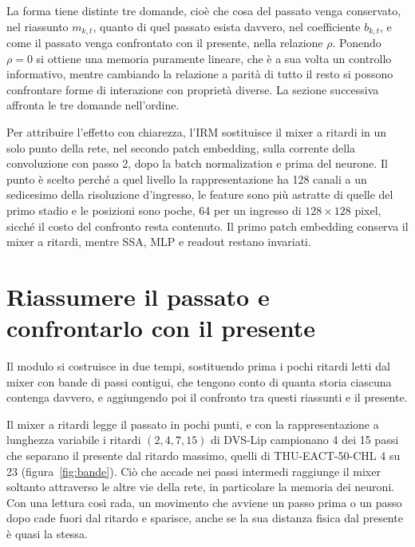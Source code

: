 La forma tiene distinte tre domande, cioè che cosa del passato venga conservato, nel riassunto $m_{k,t}$, quanto di quel passato esista davvero, nel coefficiente $b_{k,t}$, e come il passato venga confrontato con il presente, nella relazione $\rho$. Ponendo $\rho=0$ si ottiene una memoria puramente lineare, che è a sua volta un controllo informativo, mentre cambiando la relazione a parità di tutto il resto si possono confrontare forme di interazione con proprietà diverse. La sezione successiva affronta le tre domande nell'ordine.

Per attribuire l'effetto con chiarezza, l'IRM sostituisce il mixer a ritardi in un solo punto della rete, nel secondo patch embedding, sulla corrente della convoluzione con passo 2, dopo la batch normalization e prima del neurone. Il punto è scelto perché a quel livello la rappresentazione ha 128 canali a un sedicesimo della risoluzione d'ingresso, le feature sono più astratte di quelle del primo stadio e le posizioni sono poche, 64 per un ingresso di $128\times128$ pixel, sicché il costo del confronto resta contenuto. Il primo patch embedding conserva il mixer a ritardi, mentre SSA, MLP e readout restano invariati.



\section{Riassumere il passato e confrontarlo con il presente}
\label{sec:memoria_intervalli}
\label{sec:relazione}

Il modulo si costruisce in due tempi, sostituendo prima i pochi ritardi letti dal mixer con bande di passi contigui, che tengono conto di quanta storia ciascuna contenga davvero, e aggiungendo poi il confronto tra questi riassunti e il presente.

\label{subsec:ritardi_bande}
Il mixer a ritardi legge il passato in pochi punti, e con la rappresentazione a lunghezza variabile i ritardi $(2,4,7,15)$ di DVS-Lip campionano 4 dei 15 passi che separano il presente dal ritardo massimo, quelli di THU-EACT-50-CHL 4 su 23 (figura~\ref{fig:bande}). Ciò che accade nei passi intermedi raggiunge il mixer soltanto attraverso le altre vie della rete, in particolare la memoria dei neuroni. Con una lettura così rada, un movimento che avviene un passo prima o un passo dopo cade fuori dal ritardo e sparisce, anche se la sua distanza fisica dal presente è quasi la stessa.

